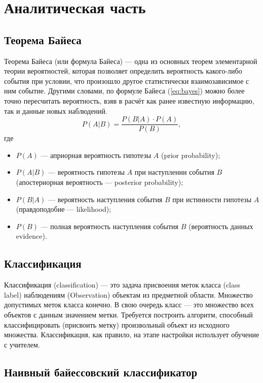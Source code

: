 \chapter{Аналитическая часть}



\section{Теорема Байеса}

Теорема Байеса (или формула Байеса) — одна из основных теорем
элементарной теории вероятностей, которая позволяет определить
вероятность какого-либо события при условии, что произошло другое
статистически взаимозависимое с ним событие. Другими словами, по
формуле Байеса (\ref{eq:bayes}) можно более точно пересчитать вероятность, взяв в расчёт
как ранее известную информацию, так и данные новых наблюдений.
\begin{equation}
\label{eq:bayes}
	P(A|B) = \frac{P(B|A) \cdot P(A)}{P(B)},
\end{equation}
где
\begin{itemize}[label*=---]
	\item $P(A)$ — априорная вероятность гипотезы $A$
	(prior probability);
	\item $P(A|B)$ — вероятность гипотезы $A$ при
	наступлении события $B$ (апостериорная
	вероятность --- posterior probability);
	\item $P(B|A)$ — вероятность наступления
	события $B$ при истинности гипотезы $A$
	(правдоподобие --- likelihood);
	\item $P(B)$ — полная вероятность наступления
	события $B$ (вероятность данных evidence).
\end{itemize}

\section{Классификация}

Классификация (classification) — это задача присвоения меток класса
(class label) наблюдениям (Observation) объектам из предметной области.
Множество допустимых меток класса конечно. В свою очередь класс —
это множество всех объектов с данным значением метки. Требуется
построить алгоритм, способный классифицировать (присвоить метку)
произвольный объект из исходного множества. Классификация, как
правило, на этапе настройки использует обучение с учителем.

\section{Наивный байессовский классификатор}


